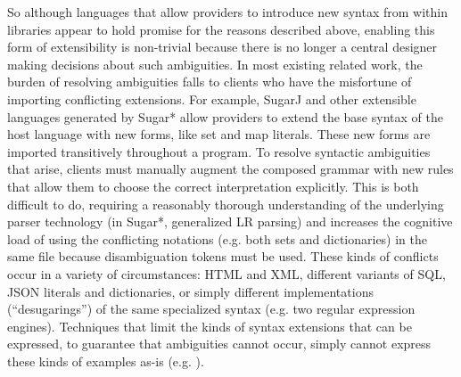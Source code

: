So although languages that allow providers to introduce new syntax from within libraries appear to hold promise for the reasons described above, enabling this form of extensibility is non-trivial because there is no longer a central designer making decisions about such ambiguities. In most existing related work, the burden of resolving ambiguities falls to clients who have the misfortune of importing conflicting extensions. For example, SugarJ \cite{erdweg2011sugarj} and other extensible languages generated by Sugar* \cite{erdweg2013framework} allow providers to extend the base syntax of the host language with new forms, like set and map literals. These new forms are imported transitively throughout a program. To resolve syntactic ambiguities that arise, clients must manually augment the composed grammar with new rules that allow them to choose the correct interpretation explicitly. This is both difficult to do, requiring a reasonably thorough understanding of the underlying parser technology (in Sugar*, generalized LR parsing) and increases the cognitive load of using the conflicting notations (e.g. both sets and dictionaries) in the same file because disambiguation tokens must be used. These kinds of conflicts occur in a variety of circumstances: HTML and XML, different variants of SQL, JSON literals and dictionaries, or simply different implementations (``desugarings'') of the same specialized syntax (e.g. two regular expression engines). Techniques that limit the kinds of syntax extensions that can be expressed, to guarantee that ambiguities cannot occur, simply cannot express these kinds of examples as-is (e.g. \cite{conf/pldi/SchwerdfegerW09}).

